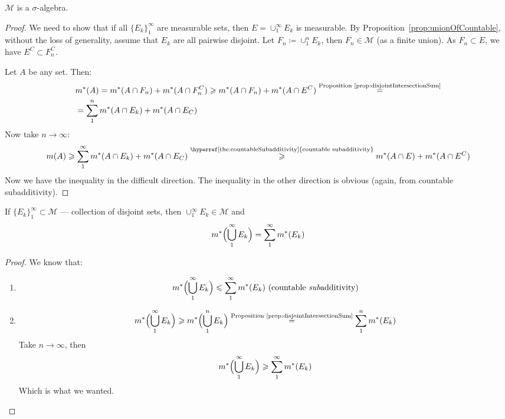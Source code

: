 \begin{theorem}
    \label{the:mIsSigmaAlgebra}
    $\mathcal{M}$ is a $\sigma$-algebra.
\end{theorem}
\begin{proof}
    We need to show that if all $\{E_k\}_1^\infty$ are measurable sets,
    then $E = \cup_1^\infty E_k$ is measurable. 
    By Proposition~\ref{prop:unionOfCountable}, without the loss of generality,
    assume that $E_k$ are all pairwise disjoint.
    Let $F_n \coloneqq \cup_1^n E_k$, then $F_n \in \mathcal{M}$
    (as a finite union). As $F_n \subset E$, we have $E^C \subset F_n^C$.

    Let $A$ be any set. Then:
    \begin{align*}
        &
        m^*(A) = m^*(A \cap F_n) + m^*(A \cap F_n^C) \ge
        m^*(A \cap F_n) + m^*(A \cap E^C)
        \overset{\text{Proposition~\ref{prop:disjointIntersectionSum}}}{=}
        \\&=
        \sum_1^n m^*(A \cap E_k) + m^*(A \cap E_C)
    \end{align*}
    Now take $n \to \infty$:
    \begin{align*}
        m(A) \ge \sum_1^\infty m^*(A \cap E_k) + m^*(A \cap E_C)
        \overset{\text{\hyperref[the:countableSubadditivity]{countable subadditivity}}}{\ge}
        m^*(A \cap E) + m^*(A \cap E^C)
    \end{align*}
    Now we have the inequality in the difficult direction. The inequality in the other direction
    is obvious (again, from countable subadditivity).
\end{proof}

\begin{proposition}
    If $\{E_k\}_1^\infty \subset \mathcal{M}$ --- collection of
    disjoint sets, then  $\cup_1^\infty E_k \in \mathcal{M}$
    and
    \[ m^*\Bigl(\bigcup_1^\infty E_k\Bigr) = \sum_1^\infty m^*(E_k) \] 
\end{proposition}
\begin{proof}
    We know that:
    \begin{enumerate}
        \item {
            \[ m^*\Bigl( \bigcup_1^\infty E_k \Bigr) \le
            \sum_1^\infty m^*(E_k) \text{ (countable \textit{sub}additivity)}\]
        }
        \item {
            \[ m^*\Bigl(\bigcup_1^\infty E_k\Bigr) \ge
            m^*\Bigl( \bigcup_1^n E_k \Bigr) \overset{\text{Proposition~\ref{prop:disjointIntersectionSum}}}{=}
            \sum_1^n m^*(E_k) \]
            Take $n \to \infty$, then
            \[ m^*\Bigl( \bigcup_1^\infty E_k \Bigr) \ge 
            \sum_1^\infty m^*(E_k) \]
            Which is what we wanted.
        }
    \end{enumerate}
\end{proof}


